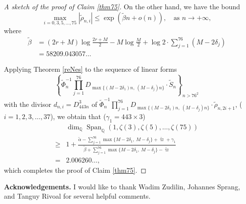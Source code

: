 \documentclass[12pt]{article}
\numberwithin{equation}{section}
\begin{document}
\begin{proof}[A sketch of the proof of Claim \ref{thm75}]
On the other hand, we have the bound
\[ \max_{i=0,3,5,\ldots,75} |\widetilde{\rho}_{n,i}| \leqslant \exp\left( \widetilde{\beta}n + o(n) \right), \quad \text{as~} n \to +\infty, \]
where
\begin{align*}
\widetilde{\beta} &= (2r+M)\log\frac{2r+M}{2} - M\log\frac{M}{2} + \log 2 \cdot \sum_{j=1}^{76}(M-2\delta_j) \\ 
&=58209.043057\ldots
\end{align*}


Applying Theorem \ref{reNes} to the sequence of linear forms 
\[ \left\{\widetilde{\Phi}_n^{-1} \prod_{j=1}^{76} D_{\max\{ (M-2\delta_1)n,~(M-\delta_j)n \}} \cdot \widetilde{S}_n \right\}_{n > 76^2} \] 
with the divisor $d_{n,i} = D_{443n}^3$ of $\widetilde{\Phi}_n^{-1} \prod_{j=1}^{76} D_{\max\{ (M-2\delta_1)n,~(M-\delta_j)n \}} \cdot \widetilde{\rho}_{n,2i+1}$, ($i=1,2,3,\ldots,37$), we obtain that ($\gamma_1=443\times 3$)
\begin{align*}
&\dim_{\mathbb{Q}}\operatorname{Span}_{\mathbb{Q}}\left( 1,\zeta(3),\zeta(5),\ldots,\zeta(75) \right) \\
\geqslant & 1 + \frac{\widetilde{\alpha} - \sum_{j=1}^{76}\max\{ M-2\delta_1,~M-\delta_j \} + \widetilde{\varpi} + \gamma_1}{\widetilde{\beta} + \sum_{j=1}^{76}\max\{ M-2\delta_1,~M-\delta_j \} - \widetilde{\varpi}} \\
=& 2.006260\ldots,
\end{align*}
which completes the proof of Claim \ref{thm75}.
\end{proof}

\bigskip
\bigskip

\noindent\textbf{Acknowledgements.} I would like to thank Wadim Zudilin, Johannes Sprang, and Tanguy Rivoal for several helpful comments.
\end{document}
